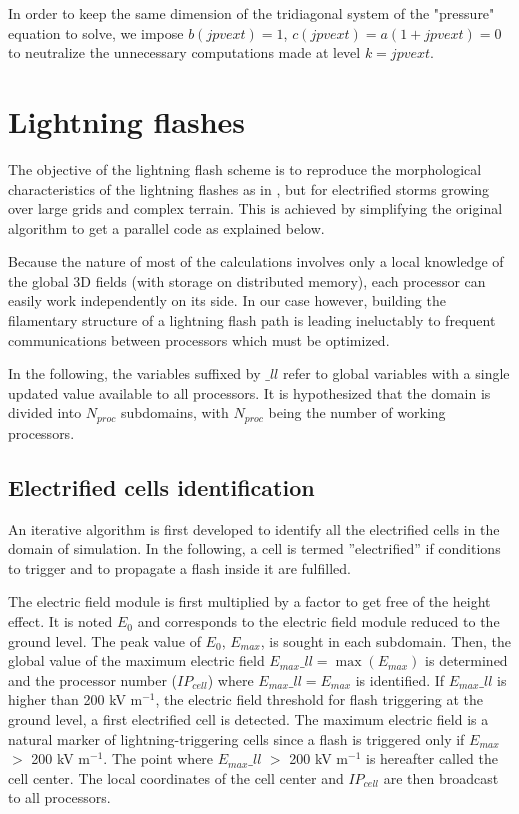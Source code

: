 In order to keep the same dimension of the tridiagonal system of the "pressure" equation to solve, we impose $b(jpvext)=1$, $c(jpvext)=a(1+jpvext)=0$ to neutralize the unnecessary computations made at level $k=jpvext$.


\section{Lightning flashes}

The objective of the lightning flash scheme is to reproduce the morphological characteristics of the lightning flashes as in \citet{Barthe-Pinty-2007-flash}, but for electrified storms growing over large grids and complex terrain. 
This is achieved by simplifying the original algorithm to get a parallel code as explained below.

Because the nature of most of the calculations involves only a local knowledge of the global 3D fields (with storage on distributed memory), each processor can easily work independently on its side.
In our case however, building the filamentary structure of a lightning flash path is leading ineluctably to frequent communications between processors which must be optimized.

In the following, the variables suffixed by $\_ll$ refer to global variables with a single updated value available to all processors.
It is hypothesized that the domain is divided into $N_{proc}$ subdomains, with $N_{proc}$ being the number of working processors.

\subsection{Electrified cells identification}

An iterative algorithm is first developed to identify all the electrified cells in the domain of simulation. 
In the following, a cell is termed ''electrified'' if conditions to trigger and to propagate a flash inside it are fulfilled. 

The electric field module is first multiplied by a factor to get free of the height effect.
It is noted $E_0$ and corresponds to the electric field module reduced to the ground level.
The peak value of $E_0$, $E_{max}$, is sought in each subdomain. 
Then, the global value of the maximum electric field $E_{max}\_ll= \max(E_{max})$ is determined and the processor number ($IP_{cell}$) where $E_{max}\_ll=E_{max}$ is identified.
If $E_{max}\_ll$ is higher than 200 kV m$^{-1}$, the electric field threshold for flash triggering at the ground level, a first electrified cell is detected. 
The maximum electric field is a natural marker of lightning-triggering cells since a flash is triggered only if $E_{max}$ $>$ 200 kV m$^{-1}$. 
The point where $E_{max} \_ll$ $>$ 200 kV m$^{-1}$ is hereafter called the cell center.
The local coordinates of the cell center and $IP_{cell}$ are then broadcast to all processors.

